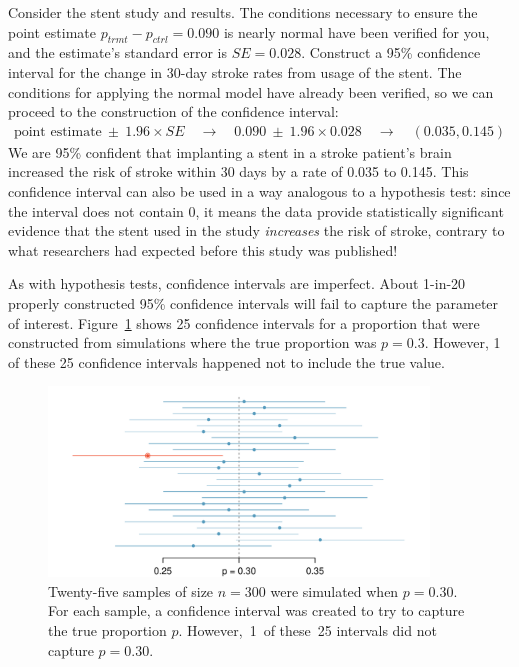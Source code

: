 \textA{\pagebreak}

\begin{example}{Consider the stent study and results. The conditions necessary to ensure the point estimate $p_{trmt} - p_{ctrl} = 0.090$ is nearly normal have been verified for you, and the estimate's standard error is $SE = 0.028$. Construct a 95\% confidence interval for the change in 30-day stroke rates from usage of the stent.}
\label{stentStroke95CI_CIsection}
The conditions for applying the normal model have already been verified, so we can proceed to the construction of the confidence interval:
\begin{align*}
\text{point estimate}\ \pm\ 1.96 \times SE \quad \rightarrow \quad
0.090\ \pm\ 1.96 \times 0.028 \quad \rightarrow \quad
(0.035, 0.145)
\end{align*}
We are 95\% confident that implanting a stent in a stroke patient's brain increased the risk of stroke within 30 days by a rate of 0.035 to 0.145. This confidence interval can also be used in a way analogous to a hypothesis test: since the interval does not contain 0, it means the data provide statistically significant evidence that the stent used in the study \emph{increases} the risk of stroke, contrary to what researchers had expected before this study was published!
\end{example}

As with hypothesis tests, confidence intervals are imperfect. About 1-in-20 properly constructed 95\% confidence intervals will fail to capture the parameter of interest. Figure~\ref{95PercentConfidenceInterval} shows 25 confidence intervals for a proportion that were constructed from simulations where the true proportion was $p = 0.3$. However, 1 of these 25 confidence intervals happened not to include the true value.

\begin{figure}[hht]
   \centering
   \includegraphics[width=0.9\textwidth]{02/figures/95PercentConfidenceInterval/95PercentConfidenceInterval}
   \caption{Twenty-five samples of size $n=300$ were simulated when $p = 0.30$. For each sample, a confidence interval was created to try to capture the true proportion $p$. However,~1~of these~25 intervals did not capture $p = 0.30$.}
   \label{95PercentConfidenceInterval}
\end{figure}

